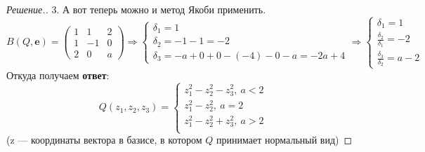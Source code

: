 \documentclass[a4paper]{article}
\theoremstyle{remark}
\newcommand{\eq}[1]{\begin{cases} #1 \end{cases}}
\begin{document}
\begin{proof}[Решение.]
            3. А вот теперь можно и метод Якоби применить. 
            \[
                B(Q,\bm{e}) = 
                \begin{pmatrix}
                    1 & 1 & 2\\
                    1 & -1 & 0 \\
                    2 & 0 & a
                \end{pmatrix} 
                \Rightarrow 
                \eq{
                    \delta_1 = 1\\
                    \delta_2 = -1 - 1 = -2 \\
                    \delta_3 = -a + 0  + 0 - (-4) - 0 - a = -2a + 4
                } 
                \Rightarrow 
                \eq{
                    \delta_1 = 1\\
                    \frac{\delta_2}{\delta_1} = -2 \\
                    \frac{\delta_3}{\delta_2} = a - 2
                }
            \]
            Откуда получаем \textbf{ответ}: 
            \[
                Q(z_1, z_2, z_3) = \eq{
                    z_1^2 - z_2^2 - z_3^2, \ a < 2\\
                    z_1^2 - z_2^2, \ a = 2\\
                    z_1^2 - z_2^2 + z_3^2, \ a > 2\\}
            \] 
            (z --- координаты вектора в базисе, в котором $Q$ 
            принимает нормальный вид)

        \end{proof}
      
\end{document}

